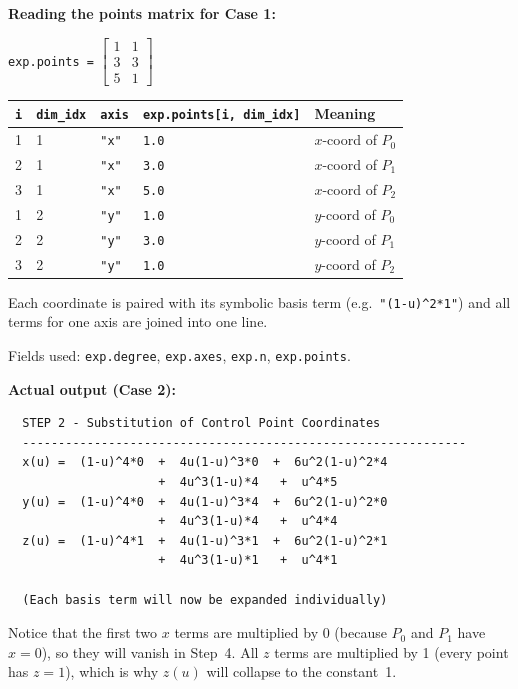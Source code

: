 \documentclass[12pt, a4paper]{article}
\newcommand{\cd}[1]{\texttt{#1}}
\begin{document}
\begin{examplebox}
\textbf{Reading the points matrix for Case 1:}

\medskip
\cd{exp.points =}
$\begin{bmatrix}1 & 1 \\ 3 & 3 \\ 5 & 1\end{bmatrix}$

\medskip
\begin{tabular}{lllll}
\toprule
\cd{i} & \cd{dim\_idx} & \cd{axis} & \cd{exp.points[i, dim\_idx]} & Meaning \\
\midrule
1 & 1 & \cd{"x"} & \cd{1.0} & $x$-coord of $P_0$ \\
2 & 1 & \cd{"x"} & \cd{3.0} & $x$-coord of $P_1$ \\
3 & 1 & \cd{"x"} & \cd{5.0} & $x$-coord of $P_2$ \\
1 & 2 & \cd{"y"} & \cd{1.0} & $y$-coord of $P_0$ \\
2 & 2 & \cd{"y"} & \cd{3.0} & $y$-coord of $P_1$ \\
3 & 2 & \cd{"y"} & \cd{1.0} & $y$-coord of $P_2$ \\
\bottomrule
\end{tabular}

\medskip
Each coordinate is paired with its symbolic basis term
(e.g.\ \cd{"(1-u)\^{}2*1"}) and all terms for one axis
are joined into one line.
\end{examplebox}

Fields used: \cd{exp.degree}, \cd{exp.axes}, \cd{exp.n}, \cd{exp.points}.

\textbf{Actual output (Case 2):}
\begin{verbatim}
  STEP 2 - Substitution of Control Point Coordinates
  --------------------------------------------------------------
  x(u) =  (1-u)^4*0  +  4u(1-u)^3*0  +  6u^2(1-u)^2*4
                     +  4u^3(1-u)*4   +  u^4*5
  y(u) =  (1-u)^4*0  +  4u(1-u)^3*4  +  6u^2(1-u)^2*0
                     +  4u^3(1-u)*4   +  u^4*4
  z(u) =  (1-u)^4*1  +  4u(1-u)^3*1  +  6u^2(1-u)^2*1
                     +  4u^3(1-u)*1   +  u^4*1

  (Each basis term will now be expanded individually)
\end{verbatim}

Notice that the first two $x$ terms are multiplied by 0
(because $P_0$ and $P_1$ have $x=0$), so they will vanish
in Step~4.
All $z$ terms are multiplied by 1 (every point has $z=1$),
which is why $z(u)$ will collapse to the constant~1.
\end{document}
